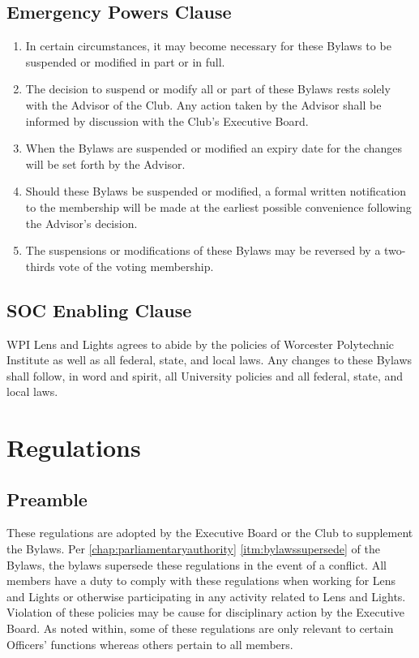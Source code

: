 \documentclass[12pt,letterpaper,oneside]{book}
\begin{document}
\chapter{Emergency Powers Clause}

\begin{enumerate}

\item In certain circumstances, it may become necessary for these Bylaws to be suspended or modified in part or in full.
\item The decision to suspend or modify all or part of these Bylaws rests solely with the Advisor of the Club. Any action taken by the Advisor shall be informed by discussion with the Club's Executive Board.
\item When the Bylaws are suspended or modified an expiry date for the changes will be set forth by the Advisor. 
\item Should these Bylaws be suspended or modified, a formal written notification to the membership will be made at the earliest possible convenience following the Advisor's decision.
\item The suspensions or modifications of these Bylaws may be reversed by a two-thirds vote of the voting membership.

\end{enumerate}

\chapter{SOC Enabling Clause}

WPI Lens and Lights agrees to abide by the policies of Worcester Polytechnic Institute as well as all federal, state, and local laws. Any changes to these Bylaws shall follow, in word and spirit, all University policies and all federal, state, and local laws.

\part{Regulations}

\renewcommand{\chaptername}{Chapter}

\chapter{Preamble}

These regulations are adopted by the Executive Board or the Club to supplement the Bylaws. Per \cref{chap:parliamentaryauthority} \cref{itm:bylawssupersede} of the Bylaws, the bylaws supersede these regulations in the event of a conflict. All members have a duty to comply with these regulations when working for Lens and Lights or otherwise participating in any activity related to Lens and Lights. Violation of these policies may be cause for disciplinary action by the Executive Board. As noted within, some of these regulations are only relevant to certain Officers' functions whereas others pertain to all members.
\end{document}
